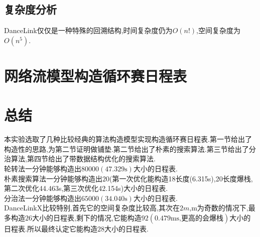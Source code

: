 \documentclass[UTF8]{ctexart}
\begin{document}
\subsection{复杂度分析}
DanceLink仅仅是一种特殊的回溯结构,时间复杂度仍为$O(n!)$,空间复杂度为$O(n^5)$.
\section{网络流模型构造循环赛日程表}
\section{总结}
本实验选取了几种比较经典的算法构造模型实现构造循环赛日程表.第一节给出了构造性的思路,为第二节证明做铺垫.第二节给出了朴素的搜索算法.第三节给出了分治算法,第四节给出了带数据结构优化的搜索算法.\\
\indent 轮转法一分钟能够构造出$80000(\text{47.329s})$大小的日程表.\\
\indent
朴素搜索算法一分钟能够构造出$20$(第一次优化能构造18长度(6.315s),20长度爆栈,第二次优化44.463s,第三次优化42.154s)大小的日程表.\\
\indent
分治法一分钟能够构造出$65000(\text{34.040s})$大小的日程表.\\
\indent
DanceLinkX比较特别,首先它的空间复杂度比较高,其次在$2m$,m为奇数的情况下,最多构造$26$大小的日程表,剩下的情况,它能构造$92(\text{0.479ms,更高的会爆栈})$大小的日程表.所以最终认定它能构造$28$大小的日程表.\\
\end{document}

